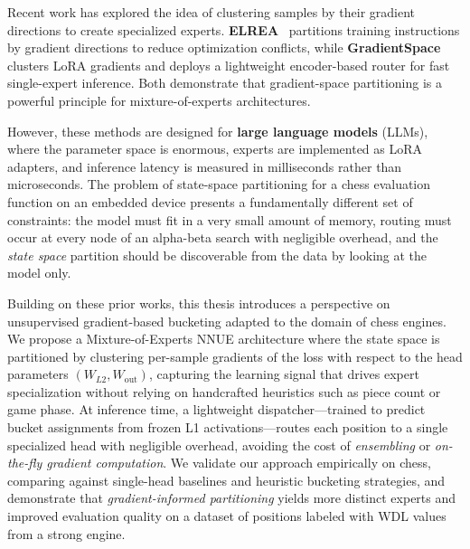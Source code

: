 Recent work has explored the idea of clustering samples by their gradient directions to create specialized experts. \textbf{ELREA}~\cite{li2025elrea} partitions training instructions by gradient directions to reduce optimization conflicts, while \textbf{GradientSpace}~\cite{sridharan2025gradientspace} clusters LoRA gradients and deploys a lightweight encoder-based router for fast single-expert inference. Both demonstrate that gradient-space partitioning is a powerful principle for mixture-of-experts architectures.

However, these methods are designed for \textbf{large language models} (LLMs), where the parameter space is enormous, experts are implemented as LoRA adapters, and inference latency is measured in milliseconds rather than microseconds. The problem of state-space partitioning for a chess evaluation function on an embedded device presents a fundamentally different set of constraints: the model must fit in a very small amount of memory, routing must occur at every node of an alpha-beta search with negligible overhead, and the \emph{state space} partition should be discoverable from the data by looking at the model only.

Building on these prior works, this thesis introduces a perspective on unsupervised gradient-based bucketing adapted to the domain of chess engines. We propose a Mixture-of-Experts NNUE architecture where the state space is partitioned by clustering per-sample gradients of the loss with respect to the head parameters \((W_{L2}, W_{\mathrm{out}})\), capturing the learning signal that drives expert specialization without relying on handcrafted heuristics such as piece count or game phase. At inference time, a lightweight dispatcher---trained to predict bucket assignments from frozen L1 activations---routes each position to a single specialized head with negligible overhead, avoiding the cost of \emph{ensembling} or \emph{on-the-fly gradient computation}. We validate our approach empirically on chess, comparing against single-head baselines and heuristic bucketing strategies, and demonstrate that \emph{gradient-informed partitioning} yields more distinct experts and improved evaluation quality on a dataset of positions labeled with WDL values from a strong engine.
